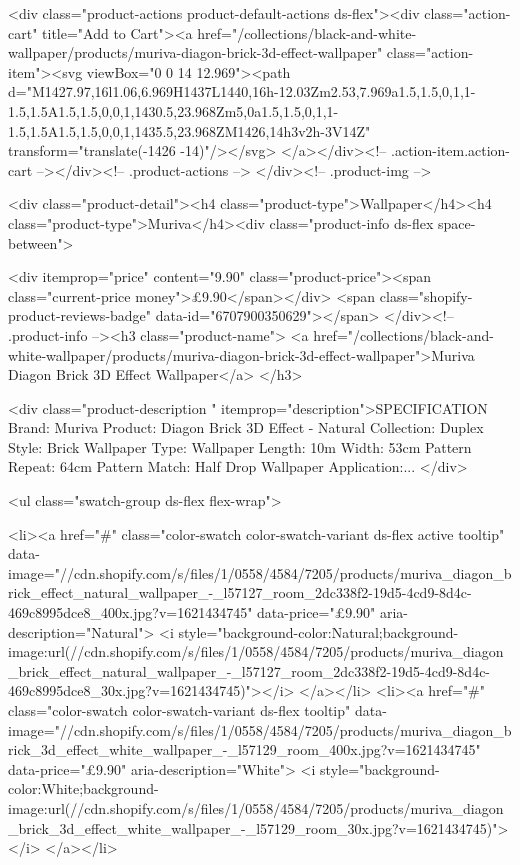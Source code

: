 {{{{{{{<div class="product-actions product-default-actions ds-flex"><div class="action-cart" title="Add to Cart"><a href="/collections/black-and-white-wallpaper/products/muriva-diagon-brick-3d-effect-wallpaper" class="action-item"><svg viewBox="0 0 14 12.969"><path d="M1427.97,16l1.06,6.969H1437L1440,16h-12.03Zm2.53,7.969a1.5,1.5,0,1,1-1.5,1.5A1.5,1.5,0,0,1,1430.5,23.968Zm5,0a1.5,1.5,0,1,1-1.5,1.5A1.5,1.5,0,0,1,1435.5,23.968ZM1426,14h3v2h-3V14Z" transform="translate(-1426 -14)"/></svg>
</a></div><!-- .action-item.action-cart --></div><!-- .product-actions -->
</div><!-- .product-img -->

<div class="product-detail"><h4 class="product-type">Wallpaper</h4><h4 class="product-type">Muriva</h4><div class="product-info ds-flex space-between">
    
<div itemprop="price" content="9.90" class="product-price"><span class="current-price money">£9.90</span></div>
    <span class="shopify-product-reviews-badge" data-id="6707900350629"></span>
  </div><!-- .product-info --><h3 class="product-name">
      <a href="/collections/black-and-white-wallpaper/products/muriva-diagon-brick-3d-effect-wallpaper">Muriva Diagon Brick 3D Effect Wallpaper</a>
    </h3>
    
<div class="product-description " itemprop="description">SPECIFICATION Brand: Muriva Product: Diagon Brick 3D Effect - Natural Collection: Duplex Style: Brick Wallpaper Type: Wallpaper Length: 10m Width: 53cm Pattern Repeat: 64cm Pattern Match: Half Drop Wallpaper Application:...
</div>



<ul class="swatch-group ds-flex flex-wrap">
        
<li><a href="#" class="color-swatch color-swatch-variant ds-flex active tooltip" data-image="//cdn.shopify.com/s/files/1/0558/4584/7205/products/muriva_diagon_brick_effect_natural_wallpaper_-_l57127_room_2dc338f2-19d5-4cd9-8d4c-469c8995dce8_400x.jpg?v=1621434745" data-price="£9.90" aria-description="Natural">
              <i style="background-color:Natural;background-image:url(//cdn.shopify.com/s/files/1/0558/4584/7205/products/muriva_diagon_brick_effect_natural_wallpaper_-_l57127_room_2dc338f2-19d5-4cd9-8d4c-469c8995dce8_30x.jpg?v=1621434745)"></i>
            </a></li>
<li><a href="#" class="color-swatch color-swatch-variant ds-flex tooltip" data-image="//cdn.shopify.com/s/files/1/0558/4584/7205/products/muriva_diagon_brick_3d_effect_white_wallpaper_-_l57129_room_400x.jpg?v=1621434745" data-price="£9.90" aria-description="White">
              <i style="background-color:White;background-image:url(//cdn.shopify.com/s/files/1/0558/4584/7205/products/muriva_diagon_brick_3d_effect_white_wallpaper_-_l57129_room_30x.jpg?v=1621434745)"></i>
            </a></li>

}}}}}}}
